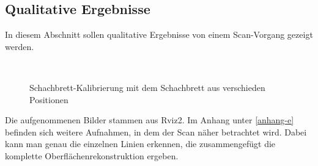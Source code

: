 		\newpage
		
		
	\subsection{Qualitative Ergebnisse}\label{chap:qual_ergeb}
	
	In diesem Abschnitt sollen qualitative Ergebnisse von einem Scan-Vorgang gezeigt werden.
	
	\begin{figure}[h]
		\centering
		 \\
		\caption[Qualitative Ergebnisse]{Schachbrett-Kalibrierung mit dem Schachbrett aus verschieden Positionen}
		\label{fig:scan_imgs}
	\end{figure}
	Die aufgenommenen Bilder stammen aus Rviz2. Im Anhang unter \ref{anhang-e} befinden sich weitere Aufnahmen, in dem der Scan näher betrachtet wird. Dabei kann man genau die einzelnen Linien erkennen, die zusammengefügt die komplette Oberflächenrekonstruktion ergeben.